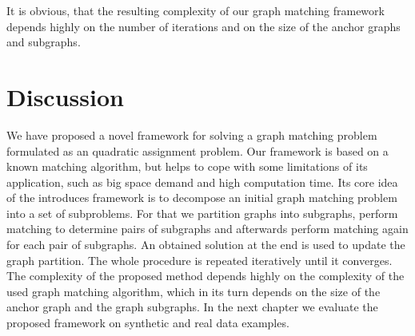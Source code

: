 It is obvious, that the resulting complexity of our graph matching framework depends highly on the number of iterations and on the size of the anchor graphs and subgraphs.


\section{Discussion}
We have proposed a novel framework for solving a graph matching problem formulated as an quadratic assignment problem. Our framework is based on a known matching algorithm, but helps to cope with some limitations of its application, such as big space demand and high computation time.
Its core idea of the introduces framework is to decompose an initial graph matching problem into a set of subproblems. For that we partition graphs into subgraphs, perform matching to determine pairs of subgraphs and afterwards perform matching again for each pair of subgraphs. An obtained solution at the end is used to update the graph partition. The whole procedure is repeated iteratively until it converges. The complexity of the proposed method depends highly on the complexity of the used graph matching algorithm, which in its turn depends on the size of the anchor graph and the graph subgraphs. In the next chapter we evaluate the proposed framework on synthetic and real data examples.
